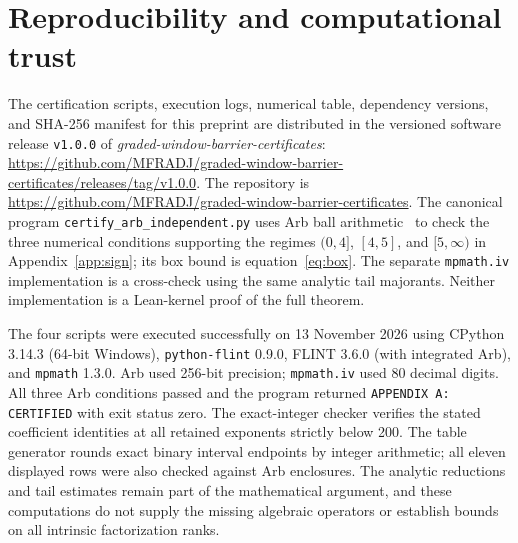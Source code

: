 \documentclass[10pt,a4paper]{article}
\numberwithin{equation}{section}
\theoremstyle{remark}\newtheorem{remark}[theorem]{Remark}\newtheorem{question}[theorem]{Question}
\begin{document}
\section{Reproducibility and computational trust}\label{app:cert}
The certification scripts, execution logs, numerical table, dependency versions, and SHA-256 manifest for this preprint are distributed in the versioned software release \texttt{v1.0.0} of \emph{graded-window-barrier-certificates}: \url{https://github.com/MFRADJ/graded-window-barrier-certificates/releases/tag/v1.0.0}. The repository is \url{https://github.com/MFRADJ/graded-window-barrier-certificates}. The canonical program \texttt{certify\_arb\_independent.py} uses Arb ball arithmetic~\cite{johansson} to check the three numerical conditions supporting the regimes $(0,4]$, $[4,5]$, and $[5,\infty)$ in Appendix~\ref{app:sign}; its box bound is equation~\eqref{eq:box}. The separate \texttt{mpmath.iv} implementation is a cross-check using the same analytic tail majorants. Neither implementation is a Lean-kernel proof of the full theorem.

The four scripts were executed successfully on 13 November 2026 using CPython 3.14.3 (64-bit Windows), \texttt{python-flint} 0.9.0, FLINT 3.6.0 (with integrated Arb), and \texttt{mpmath} 1.3.0. Arb used 256-bit precision; \texttt{mpmath.iv} used 80 decimal digits. All three Arb conditions passed and the program returned \texttt{APPENDIX A: CERTIFIED} with exit status zero. The exact-integer checker verifies the stated coefficient identities at all retained exponents strictly below 200. The table generator rounds exact binary interval endpoints by integer arithmetic; all eleven displayed rows were also checked against Arb enclosures. The analytic reductions and tail estimates remain part of the mathematical argument, and these computations do not supply the missing algebraic operators or establish bounds on all intrinsic factorization ranks.
\end{document}
